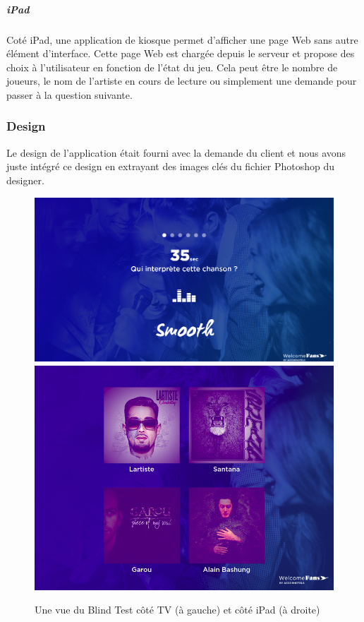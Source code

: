 \subparagraph{iPad} Coté iPad, une application de kiosque permet d'afficher une page Web sans autre élément d'interface.
Cette page Web est chargée depuis le serveur et propose des choix à l'utilisateur en fonction de l'état du jeu.
Cela peut être le nombre de joueurs, le nom de l'artiste en cours de lecture ou simplement une demande pour passer à la question suivante.

\subsubsection{Design}

Le design de l'application était fourni avec la demande du client et nous avons juste intégré ce design en extrayant des images clés du fichier Photoshop du designer.

\begin{figure}[h]
    \centering
    \includegraphics[scale=0.23]{img/blind-test-tv.png}
    \includegraphics[scale=0.22]{img/blind-test-ipad.png}
    \caption{Une vue du Blind Test côté TV (à gauche) et côté iPad (à droite)}
\end{figure}

